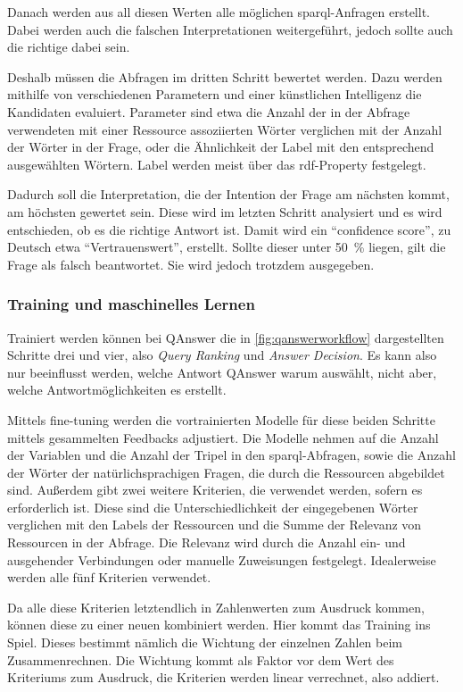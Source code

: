 Danach werden aus all diesen Werten alle möglichen \ac{sparql}-Anfragen erstellt.
Dabei werden auch die falschen Interpretationen weitergeführt, jedoch sollte auch die richtige dabei sein.

Deshalb müssen die Abfragen im dritten Schritt bewertet werden.
Dazu werden mithilfe von verschiedenen Parametern und einer künstlichen Intelligenz die Kandidaten evaluiert.
Parameter sind etwa die Anzahl der in der Abfrage verwendeten mit einer Ressource assoziierten Wörter verglichen mit der Anzahl der Wörter in der Frage,
oder die Ähnlichkeit der Label mit den entsprechend ausgewählten Wörtern.
Label werden meist über das \ac{rdf}-Property  festgelegt.

Dadurch soll die Interpretation, die der Intention der Frage am nächsten kommt, am höchsten gewertet sein.
Diese wird im letzten Schritt analysiert und es wird entschieden, ob es die richtige Antwort ist.
Damit wird ein \enquote{confidence score}, zu Deutsch etwa \enquote{Vertrauenswert}, erstellt.
Sollte dieser unter \SI{50}{\%} liegen, gilt die Frage als falsch beantwortet.
Sie wird jedoch trotzdem ausgegeben.

\subsubsection{Training und maschinelles Lernen}

Trainiert werden können bei QAnswer die in \cref{fig:qanswerworkflow} dargestellten Schritte drei und vier, also \emph{Query Ranking} und \emph{Answer Decision}.
Es kann also nur beeinflusst werden, welche Antwort QAnswer warum auswählt, nicht aber, welche Antwortmöglichkeiten es erstellt.

Mittels fine-tuning werden die vortrainierten Modelle für diese beiden Schritte mittels gesammelten Feedbacks adjustiert.
Die Modelle nehmen auf die Anzahl der Variablen und die Anzahl der Tripel in den \ac{sparql}-Abfragen,
sowie die Anzahl der Wörter der natürlichsprachigen Fragen, die durch die Ressourcen abgebildet sind.
Außerdem gibt zwei weitere Kriterien, die verwendet werden, sofern es erforderlich ist.
Diese sind die Unterschiedlichkeit der eingegebenen Wörter verglichen mit den Labels der Ressourcen
und die Summe der Relevanz von Ressourcen in der Abfrage.
Die Relevanz wird durch die Anzahl ein- und ausgehender Verbindungen oder manuelle Zuweisungen festgelegt.
Idealerweise werden alle fünf Kriterien verwendet.

Da alle diese Kriterien letztendlich in Zahlenwerten zum Ausdruck kommen, können diese zu einer neuen kombiniert werden.
Hier kommt das Training ins Spiel.
Dieses bestimmt nämlich die Wichtung der einzelnen Zahlen beim Zusammenrechnen.
Die Wichtung kommt als Faktor vor dem Wert des Kriteriums zum Ausdruck, die Kriterien werden linear verrechnet, also addiert.

